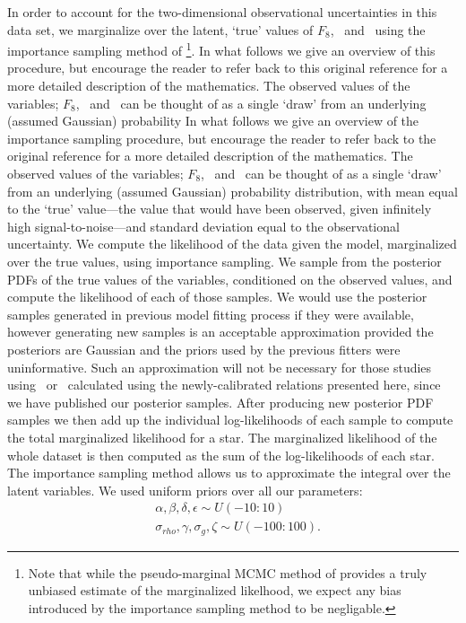 In order to account for the two-dimensional observational uncertainties in
this data set, we marginalize over the latent, `true' values of $F_8$,
\rhostar\ and \logg\ using the importance sampling method of
\citep{hogg:2010}\footnote{Note that while the pseudo-marginal MCMC method of
\citep{andrieu:2009} provides a truly unbiased estimate of the marginalized
likelhood, we expect any bias introduced by the importance sampling method to
be negligable.}.
In what follows we give an overview of this procedure, but encourage the
reader to refer back  to this original reference for a more detailed
description of the mathematics.
The observed values of the variables; $F_8$, \rhostar\ and \logg\ can be
thought of as a single `draw' from an underlying (assumed Gaussian)
probability
In what follows we give an overview of the importance sampling procedure, but
encourage the reader to refer back to the original reference for a more
detailed description of the mathematics.
The observed values of the variables; $F_8$, \rhostar\ and \logg\ can be
thought of as a single `draw' from an underlying (assumed Gaussian)
probability distribution, with mean equal to the `true' value---the value that
would have been observed, given infinitely high signal-to-noise---and standard
deviation equal to the observational uncertainty.
We compute the likelihood of the data given the model, marginalized over the
true values, using importance sampling.
We sample from the posterior PDFs of the true values of the variables,
conditioned on the observed values, and compute the likelihood of each of those
samples.
We would use the posterior samples generated in previous model fitting process
if they were available, however generating new samples is an acceptable
approximation provided the posteriors are Gaussian and the priors used by the
previous fitters were uninformative.
Such an approximation will not be necessary for those studies using \rhostar\
or \logg\ calculated using the newly-calibrated relations presented here,
since we have published our posterior samples.
After producing new posterior PDF samples we then add up the individual
log-likelihoods of each sample to compute the total marginalized likelihood
for a star.
The marginalized likelihood of the whole dataset is then computed as the sum
of the log-likelihoods of each star.
The importance sampling method allows us to approximate the integral over the
latent variables.
We used uniform priors over all our parameters:
\begin{eqnarray}
	&	\alpha, \beta, \delta, \epsilon
	\sim U(-10:10) \\ \nonumber
 	&	\sigma_{rho}, \gamma, \sigma_g, \zeta  \sim U(-100:100).
\end{eqnarray}
\label{eq:priors}

